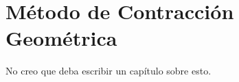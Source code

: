 \chapter{Método de Contracción Geométrica}
\label{ch:au}

No creo que deba escribir un capítulo sobre esto.